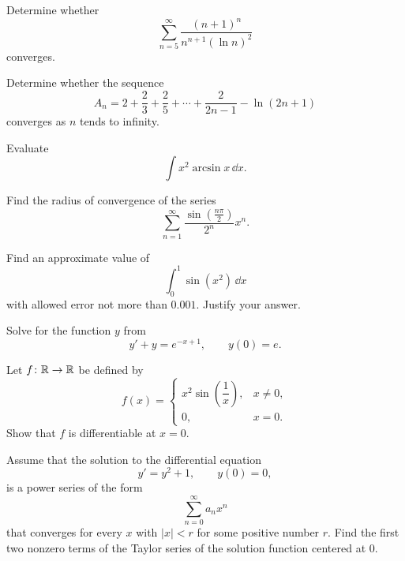 \begin{problem}
Determine whether
\[
\sum_{n=5}^{\infty}
\frac{(n+1)^n}{n^{n+1}(\ln n)^2}
\]
converges.
\end{problem}

\begin{problem}
Determine whether the sequence
\[
A_n
=2+\frac{2}{3}+\frac{2}{5}+\cdots+\frac{2}{2n-1}-\ln(2n+1)
\]
converges as $n$ tends to infinity.
\end{problem}

\begin{problem}
Evaluate
\[
\int x^2\arcsin x\,\dd x.
\]
\end{problem}

\begin{problem}
Find the radius of convergence of the series
\[
\sum_{n=1}^{\infty}
\frac{\sin\!\left(\frac{n\pi}{2}\right)}{2^n}x^n.
\]
\end{problem}

\begin{problem}
Find an approximate value of
\[
\int_0^1\sin(x^2)\,\dd x
\]
with allowed error not more than $0.001$. Justify your answer.
\end{problem}

\begin{problem}
Solve for the function $y$ from
\[
y'+y=e^{-x+1},
\qquad
y(0)=e.
\]
\end{problem}

\begin{problem}
Let $f\colon\mathbb{R}\to\mathbb{R}$ be defined by
\[
f(x)=
\begin{cases}
x^2\sin\!\left(\dfrac{1}{x}\right), & x\ne0, \\[0.6em]
0, & x=0.
\end{cases}
\]
Show that $f$ is differentiable at $x=0$.
\end{problem}

\begin{problem}
Assume that the solution to the differential equation
\[
y'=y^2+1,
\qquad
y(0)=0,
\]
is a power series of the form
\[
\sum_{n=0}^{\infty}a_nx^n
\]
that converges for every $x$ with $|x|<r$ for some positive number $r$. Find the first two nonzero terms of the Taylor series of the solution function centered at $0$.
\end{problem}


